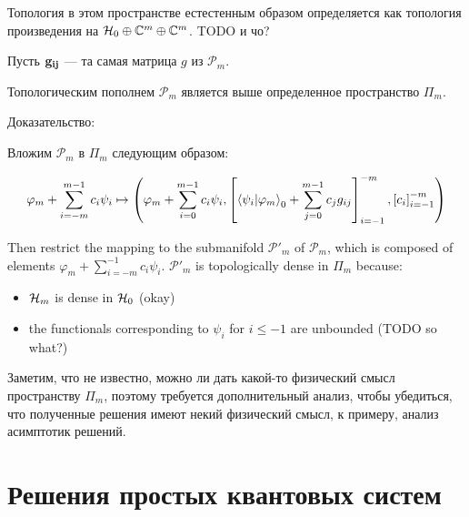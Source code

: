 Топология в этом пространстве естестенным образом определяется как топология произведения на $\mathcal{H}_{0} \oplus \mathbb{C}^m \oplus \mathbb{C}^m$. TODO и чо?

Пусть $\vb{g_{ij}}$ — та самая матрица $g$ из $\mathcal{P}_m$. 

\begin{theorem}
Топологическим пополнем $\mathcal{P}_m$ является выше определенное пространство $\Pi_m$.
\end{theorem}

Доказательство:

Вложим $\mathcal{P}_m$ в $\Pi_m$ следующим образом:

\[
\varphi_m + \sum\limits_{i = -m}^{m - 1} c_i \psi_i \mapsto
\left(
\varphi_m + \sum\limits_{i = 0}^{m - 1} c_i \psi_i,
\left[ \ip{\psi_i}{\varphi_m}_0 + \sum\limits_{j = 0}^{m - 1} c_j g_{ij} \right]_{i = -1}^{-m},
\left[ c_i \right]_{i = -1}^{-m}
\right)
\]

Then restrict the mapping to the submanifold $\mathcal{P}'_m$ of $\mathcal{P}_m$, which is composed of elements $\varphi_m + \sum\limits_{i = - m}^{-1} c_i \psi_i$. $\mathcal{P}'_m$ is topologically dense in $\Pi_m$ because:

\begin{itemize}
\item $\mathcal{H}_{m}$ is dense in $\mathcal{H}_{0}$ (okay)
\item the functionals corresponding to $\psi_i$ for $i \le -1$ are unbounded (TODO so what?)
\end{itemize}


Заметим, что не известно, можно ли дать какой-то физический смысл пространству $\Pi_m$, поэтому требуется дополнительный анализ, чтобы убедиться, что полученные решения имеют некий физический смысл, к примеру, анализ асимптотик решений.



\section{Решения простых квантовых систем}
